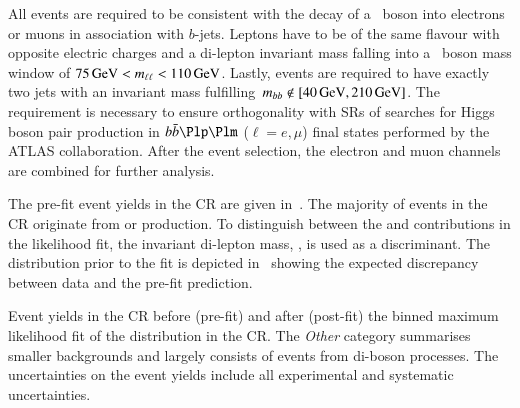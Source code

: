 All events are required to be consistent with the decay of a \PZ~boson into
electrons or muons in association with $b$-jets. Leptons have to be of the same
flavour with opposite electric charges and a di-lepton invariant mass falling
into a \PZ~boson mass window of $\SI{75}{\ensuremath{\text{GeV}}} < m_{\ell\ell} < \SI{110}{\ensuremath{\text{GeV}}}$. Lastly,
events are required to have exactly two \btagged jets with an invariant mass
fulfilling~\mbox{$\mBB \not\in [\SI{40}{\GeV}, \SI{210}{\GeV}]$}. The \mBB
requirement is necessary to ensure orthogonality with SRs of searches for Higgs
boson pair production in $\bbbar\Plp\Plm$ ($\ell = e, \mu$) final states
performed by the ATLAS collaboration.
After the event selection, the electron and muon channels are combined for
further analysis.

The pre-fit event yields in the \ZHF CR are given in~. The
majority of events in the CR originate from \ZHF
or \ttbar production.
To distinguish between the \ZHF and \ttbar contributions in the likelihood fit,
the invariant di-lepton mass, \mll, is used as a discriminant. The \mll
distribution prior to the fit is depicted in~ showing
the expected discrepancy between data and the pre-fit prediction.

\begin{table}[htbp]
  \centering

  \caption[Event yields in the \ZHF~CR before and after the fit.]{Event yields
    in the \ZHF CR before (pre-fit) and after (post-fit) the binned maximum
    likelihood fit of the \mll distribution in the CR. The \emph{Other} category
    summarises smaller backgrounds and largely consists of events from di-boson
    processes. The uncertainties on the event yields include all experimental
    and systematic uncertainties.}%
  \label{tab:zcr_yields}

  
\end{table}

